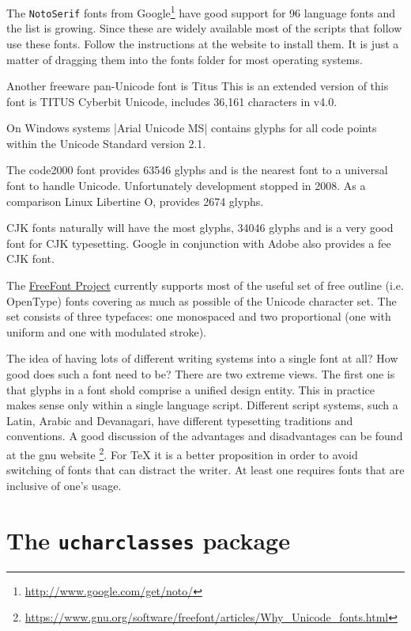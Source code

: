 The \texttt{NotoSerif} fonts from Google\footnote{\protect\url{http://www.google.com/get/noto/}} have good support for 96 language fonts and the list is growing. Since these are widely available most of the scripts that follow use these fonts. Follow the instructions at the website to install them. It is just a matter of dragging them into the fonts folder for most operating systems.

Another freeware pan-Unicode font is Titus
This is an extended version of this font is TITUS Cyberbit Unicode, includes 36,161 characters in v4.0.

On Windows systems |Arial Unicode MS| contains glyphs for all code points within the Unicode Standard version 2.1.  

The code2000 font provides 63546 glyphs and is the nearest font to a universal font to handle Unicode. Unfortunately development stopped in 2008. As a comparison Linux Libertine O, provides 2674 glyphs. \label{code2000}

CJK fonts naturally will have the most glyphs,  34046 glyphs and is a very good font for CJK typesetting. Google in conjunction with Adobe also provides a fee CJK font.

The \href{http://ftp.gnu.org/gnu/freefont/}{FreeFont Project} currently supports most of the useful set of free outline (i.e. OpenType) fonts covering as much as possible of the Unicode character set. The set consists of three typefaces: one monospaced and two proportional (one with uniform and one with modulated stroke). 

The idea of having lots of different writing systems into a single font at all? How good does such a font need to be?
There are two extreme views.  The first one is that glyphs in a font shold comprise a unified design entity. This in practice makes sense only within a single language script. Different script systems, such a Latin, Arabic and Devanagari, have different typesetting traditions and conventions.  A good discussion of the advantages and disadvantages can be found at the gnu website \footnote{\protect\url{https://www.gnu.org/software/freefont/articles/Why_Unicode_fonts.html}}. For TeX it is a better proposition in order to avoid switching of fonts that can distract the writer. At least one requires fonts that are inclusive of one's usage. 

\section{The \texttt{ucharclasses} package}

